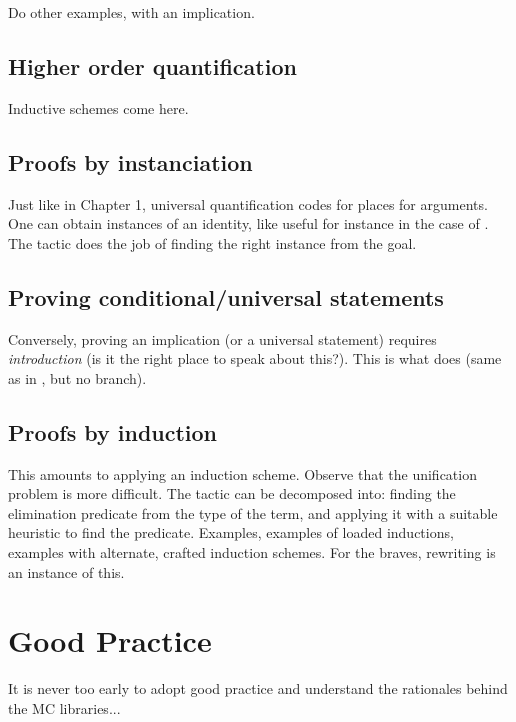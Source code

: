 Do other examples, with an implication.

\subsection{Higher order quantification}

Inductive schemes come here.

\subsection{Proofs by instanciation}

Just like in Chapter 1, universal quantification codes for places for
arguments. One can obtain instances of an identity, like
 useful for instance in the case of . The
 tactic does the job of finding the right instance from the
goal.

\subsection{Proving conditional/universal statements}

Conversely, proving an implication (or a universal statement) requires
\emph{introduction} (is it the right place to speak about this?). This
is what  does (same as in , but no branch).

\subsection{Proofs by induction}\label{ssec:ind}

This amounts to applying an induction scheme. Observe that the
unification problem is more difficult. The 
tactic can be decomposed into: finding the elimination predicate from
the type of the term, and applying it with a suitable heuristic to
find the predicate. Examples, examples of loaded inductions, examples
with alternate, crafted induction schemes. For the braves, rewriting
is an instance of this.



\section{Good Practice}\label{sec:goodprac}
It is never too early to adopt good practice and understand the
rationales behind the MC libraries...

